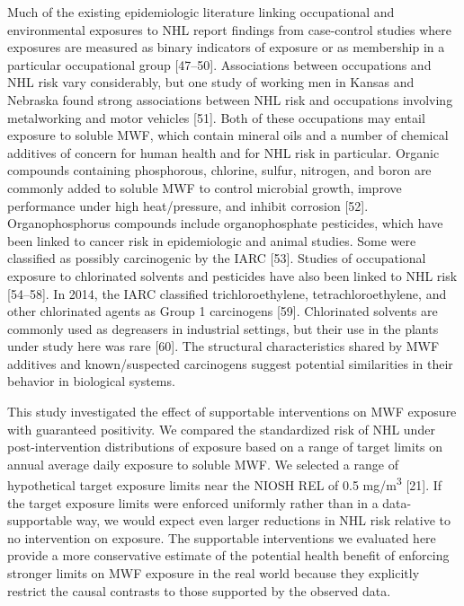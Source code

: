 \documentclass[
  11pt,
  letterpaper,
  DIV=11,
  numbers=noendperiod]{scrartcl}
\begin{document}
Much of the existing epidemiologic literature linking occupational and
environmental exposures to NHL report findings from case-control studies
where exposures are measured as binary indicators of exposure or as
membership in a particular occupational group {[}47--50{]}. Associations
between occupations and NHL risk vary considerably, but one study of
working men in Kansas and Nebraska found strong associations between NHL
risk and occupations involving metalworking and motor vehicles {[}51{]}.
Both of these occupations may entail exposure to soluble MWF, which
contain mineral oils and a number of chemical additives of concern for
human health and for NHL risk in particular. Organic compounds
containing phosphorous, chlorine, sulfur, nitrogen, and boron are
commonly added to soluble MWF to control microbial growth, improve
performance under high heat/pressure, and inhibit corrosion {[}52{]}.
Organophosphorus compounds include organophosphate pesticides, which
have been linked to cancer risk in epidemiologic and animal studies.
Some were classified as possibly carcinogenic by the IARC {[}53{]}.
Studies of occupational exposure to chlorinated solvents and pesticides
have also been linked to NHL risk {[}54--58{]}. In 2014, the IARC
classified trichloroethylene, tetrachloroethylene, and other chlorinated
agents as Group 1 carcinogens {[}59{]}. Chlorinated solvents are
commonly used as degreasers in industrial settings, but their use in the
plants under study here was rare {[}60{]}. The structural
characteristics shared by MWF additives and known/suspected carcinogens
suggest potential similarities in their behavior in biological systems.

This study investigated the effect of supportable interventions on MWF
exposure with guaranteed positivity. We compared the standardized risk
of NHL under post-intervention distributions of exposure based on a
range of target limits on annual average daily exposure to soluble MWF.
We selected a range of hypothetical target exposure limits near the
NIOSH REL of 0.5 mg/m\textsuperscript{3} {[}21{]}. If the target
exposure limits were enforced uniformly rather than in a
data-supportable way, we would expect even larger reductions in NHL risk
relative to no intervention on exposure. The supportable interventions
we evaluated here provide a more conservative estimate of the potential
health benefit of enforcing stronger limits on MWF exposure in the real
world because they explicitly restrict the causal contrasts to those
supported by the observed data.
\end{document}
